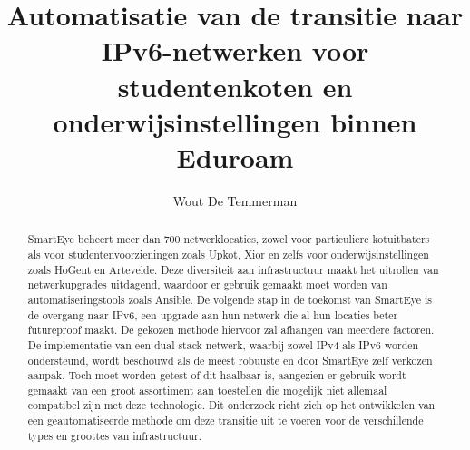 \documentclass{hogent-article}
\title{Automatisatie van de transitie naar IPv6-netwerken voor studentenkoten en onderwijsinstellingen binnen Eduroam}
\author{Wout De Temmerman}
\begin{document}
\begin{abstract}
  SmartEye beheert meer dan 700 netwerklocaties, zowel voor particuliere kotuitbaters als voor studentenvoorzieningen zoals Upkot, Xior en zelfs voor onderwijsinstellingen zoals HoGent en Artevelde.
  Deze diversiteit aan infrastructuur maakt het uitrollen van netwerkupgrades uitdagend, waardoor er gebruik gemaakt moet worden van automatiseringstools zoals Ansible.
  De volgende stap in de toekomst van SmartEye is de overgang naar IPv6, een upgrade aan hun netwerk die al hun locaties beter futureproof maakt.
  De gekozen methode hiervoor zal afhangen van meerdere factoren. De implementatie van een dual-stack netwerk, waarbij zowel IPv4 als IPv6 worden ondersteund, wordt beschouwd als de meest robuuste en door SmartEye zelf verkozen aanpak.
  Toch moet worden getest of dit haalbaar is, aangezien er gebruik wordt gemaakt van een groot assortiment aan toestellen die mogelijk niet allemaal compatibel zijn met deze technologie.
  Dit onderzoek richt zich op het ontwikkelen van een geautomatiseerde methode om deze transitie uit te voeren voor de verschillende types en groottes van infrastructuur.
\end{abstract}

\tableofcontents



\printbibliography[heading=bibintoc]
\end{document}
